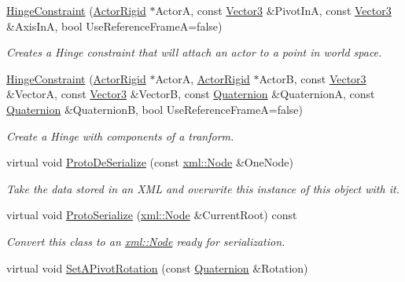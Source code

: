 \begin{DoxyCompactItemize}
\hyperlink{classphys_1_1HingeConstraint_ab112696e53f61f57f4ca53b299e9ef87}{HingeConstraint} (\hyperlink{classphys_1_1ActorRigid}{ActorRigid} $\ast$ActorA, const \hyperlink{classphys_1_1Vector3}{Vector3} \&PivotInA, const \hyperlink{classphys_1_1Vector3}{Vector3} \&AxisInA, bool UseReferenceFrameA=false)
\begin{DoxyCompactList}\small\item\em Creates a Hinge constraint that will attach an actor to a point in world space. \item\end{DoxyCompactList}\item 
\hyperlink{classphys_1_1HingeConstraint_af21f5ee3889f1bd9e70063c04db32af0}{HingeConstraint} (\hyperlink{classphys_1_1ActorRigid}{ActorRigid} $\ast$ActorA, \hyperlink{classphys_1_1ActorRigid}{ActorRigid} $\ast$ActorB, const \hyperlink{classphys_1_1Vector3}{Vector3} \&VectorA, const \hyperlink{classphys_1_1Vector3}{Vector3} \&VectorB, const \hyperlink{classphys_1_1Quaternion}{Quaternion} \&QuaternionA, const \hyperlink{classphys_1_1Quaternion}{Quaternion} \&QuaternionB, bool UseReferenceFrameA=false)
\begin{DoxyCompactList}\small\item\em Create a Hinge with components of a tranform. \item\end{DoxyCompactList}\item 
virtual void \hyperlink{classphys_1_1HingeConstraint_a63ca807d27fd21a24b4bcaa642febc77}{ProtoDeSerialize} (const \hyperlink{classphys_1_1xml_1_1Node}{xml::Node} \&OneNode)
\begin{DoxyCompactList}\small\item\em Take the data stored in an XML and overwrite this instance of this object with it. \item\end{DoxyCompactList}\item 
virtual void \hyperlink{classphys_1_1HingeConstraint_a04fac5312ddf891adcfff67e98f75861}{ProtoSerialize} (\hyperlink{classphys_1_1xml_1_1Node}{xml::Node} \&CurrentRoot) const 
\begin{DoxyCompactList}\small\item\em Convert this class to an \hyperlink{classphys_1_1xml_1_1Node}{xml::Node} ready for serialization. \item\end{DoxyCompactList}\item 
virtual void \hyperlink{classphys_1_1HingeConstraint_a7f597ee71540986b446a2771f25b791c}{SetAPivotRotation} (const \hyperlink{classphys_1_1Quaternion}{Quaternion} \&Rotation)

\end{DoxyCompactItemize}
